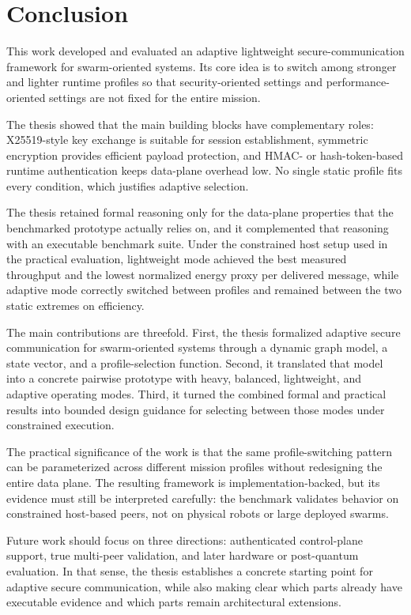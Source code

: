 \chapter{Conclusion}
\label{chap:conclusion}

This work developed and evaluated an adaptive lightweight secure-communication framework for swarm-oriented systems. Its core idea is to switch among stronger and lighter runtime profiles so that security-oriented settings and performance-oriented settings are not fixed for the entire mission.

The thesis showed that the main building blocks have complementary roles: X25519-style key exchange is suitable for session establishment, symmetric encryption provides efficient payload protection, and HMAC- or hash-token-based runtime authentication keeps data-plane overhead low. No single static profile fits every condition, which justifies adaptive selection.

The thesis retained formal reasoning only for the data-plane properties that the benchmarked prototype actually relies on, and it complemented that reasoning with an executable benchmark suite. Under the constrained host setup used in the practical evaluation, lightweight mode achieved the best measured throughput and the lowest normalized energy proxy per delivered message, while adaptive mode correctly switched between profiles and remained between the two static extremes on efficiency.

The main contributions are threefold. First, the thesis formalized adaptive secure communication for swarm-oriented systems through a dynamic graph model, a state vector, and a profile-selection function. Second, it translated that model into a concrete pairwise prototype with heavy, balanced, lightweight, and adaptive operating modes. Third, it turned the combined formal and practical results into bounded design guidance for selecting between those modes under constrained execution.

The practical significance of the work is that the same profile-switching pattern can be parameterized across different mission profiles without redesigning the entire data plane. The resulting framework is implementation-backed, but its evidence must still be interpreted carefully: the benchmark validates behavior on constrained host-based peers, not on physical robots or large deployed swarms.

Future work should focus on three directions: authenticated control-plane support, true multi-peer validation, and later hardware or post-quantum evaluation. In that sense, the thesis establishes a concrete starting point for adaptive secure communication, while also making clear which parts already have executable evidence and which parts remain architectural extensions.
